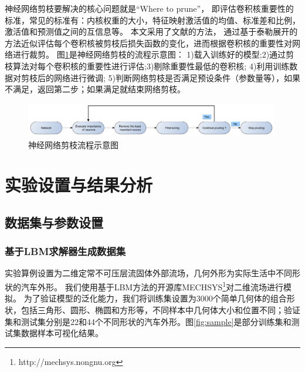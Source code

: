 神经网络剪枝要解决的核心问题就是“Where to prune”，
即评估卷积核重要性的标准，常见的标准有：内核权重的大小，特征映射激活值的均值、标准差和比例，激活值和预测值之间的互信息等。
本文采用了文献\cite{DBLP:conf/iclr/MolchanovTKAK17}的方法，
通过基于泰勒展开的方法近似评估每个卷积核被剪枝后损失函数的变化，进而根据卷积核的重要性对网络进行裁剪。
图\ref{fig:pruning}是神经网络剪枝的流程示意图：
1)载入训练好的模型;2)通过剪枝算法对每个卷积核的重要性进行评估;3)剔除重要性最低的卷积核;
4)利用训练数据对剪枝后的网络进行微调;
5)判断网络剪枝是否满足预设条件（参数量等），如果不满足，返回第二步；如果满足就结束网络剪枝。
 

\begin{figure}[htp]
	\centering
	\includegraphics[width=0.99\textwidth]{figures/pruning_flow.pdf}
	\caption{神经网络剪枝流程示意图}
	\label{fig:pruning}
\end{figure}



\section{实验设置与结果分析}

\subsection{数据集与参数设置}

\subsubsection{基于LBM求解器生成数据集}
实验算例设置为二维定常不可压层流固体外部流场，几何外形为实际生活中不同形状的汽车外形。
我们使用基于LBM方法的开源库MECHSYS\footnote{ http://mechsys.nongnu.org}对二维流场进行模拟。
为了验证模型的泛化能力，我们将训练集设置为3000个简单几何体的组合形状，包括三角形、圆形、椭圆和方形等，不同样本中几何体大小和位置不同；验证集和测试集分别是22和44个不同形状的汽车外形。图\ref{fig:sample}是部分训练集和测试集数据样本可视化结果。

